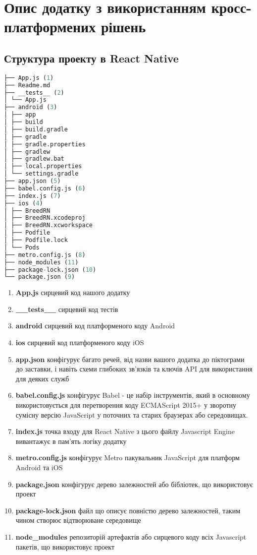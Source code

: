 \chapter{Опис додатку з використанням кросс-платформених рішень}
\label{ch2}


\section{Структура проекту в React Native}
\label{section.2.1}

\begin{lstlisting}[style=light, language=Python,label={lst:rn_app_structure},caption=React Native App Layout]
├── App.js (1)
├── Readme.md
├── __tests__ (2)
│ └── App.js
├── android (3)
│ ├── app
│ ├── build
│ ├── build.gradle
│ ├── gradle
│ ├── gradle.properties
│ ├── gradlew
│ ├── gradlew.bat
│ ├── local.properties
│ └── settings.gradle
├── app.json (5)
├── babel.config.js (6)
├── index.js (7)
├── ios (4)
│ ├── BreedRN
│ ├── BreedRN.xcodeproj
│ ├── BreedRN.xcworkspace
│ ├── Podfile
│ ├── Podfile.lock
│ └── Pods
├── metro.config.js (8)
├── node_modules (11)
├── package-lock.json (10)
└── package.json (9)
\end{lstlisting}

\begin{enumerate}
    \item \textbf{App.js} сирцевий код нашого додатку
    \item \textbf{\_\_tests\_\_} сирцевий код тестів
    \item \textbf{android} сирцевий код платформеного коду Android
    \item \textbf{ios} сирцевий код платформеного коду iOS
    \item \textbf{app.json} конфігурує багато речей, від назви вашого додатка до піктограми до заставки, і навіть схеми глибоких зв’язків та ключів API для використання для деяких служб
    \item \textbf{babel.config.js} конфігурує Babel - це набір інструментів, який в основному використовується для перетворення коду ECMAScript 2015+ у зворотну сумісну версію JavaScript у поточних та старих браузерах або середовищах.
    \item \textbf{index.js} точка входу для React Native з цього файлу Javascript Engine вивантажує в пам'ять логіку додатку
    \item \textbf{metro.config.js} конфігурує Metro пакувальник JavaScript для платформ Android та iOS
    \item \textbf{package.json} конфігурує дерево залежностей або бібліотек, що використовує проект
    \item \textbf{package-lock.json} файл що описує повністю дерево залежностей, таким чином створює відтворюване середовище
    \item \textbf{node\_modules} репозиторій артефактів або сирцевого коду всіх Javascript пакетів, що використовує проект
\end{enumerate}


